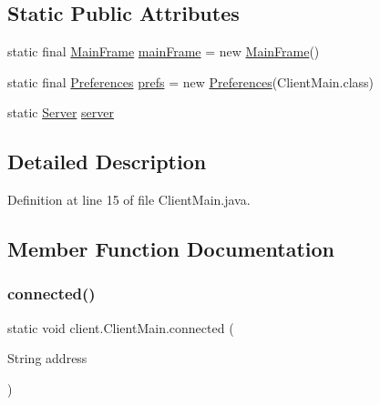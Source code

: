 \subsection*{Static Public Attributes}
\begin{DoxyCompactItemize}
\item 
static final \hyperlink{classclient_1_1ui_1_1_main_frame}{Main\+Frame} \hyperlink{classclient_1_1_client_main_ab0ba57ef294e065b9140994413a5d705}{main\+Frame} = new \hyperlink{classclient_1_1ui_1_1_main_frame}{Main\+Frame}()
\item 
static final \hyperlink{classpt_1_1up_1_1fe_1_1lpro1613_1_1sharedlib_1_1utils_1_1_preferences}{Preferences} \hyperlink{classclient_1_1_client_main_ac9b44e4112c8079879407cb8292d5fe3}{prefs} = new \hyperlink{classpt_1_1up_1_1fe_1_1lpro1613_1_1sharedlib_1_1utils_1_1_preferences}{Preferences}(Client\+Main.\+class)
\item 
static \hyperlink{classclient_1_1conn_1_1_server}{Server} \hyperlink{classclient_1_1_client_main_a933025baa76b4803c185b02d359a7e15}{server}
\end{DoxyCompactItemize}


\subsection{Detailed Description}


Definition at line 15 of file Client\+Main.\+java.



\subsection{Member Function Documentation}
\hypertarget{classclient_1_1_client_main_a37085a4271a663544855402f2892fb51}{}\label{classclient_1_1_client_main_a37085a4271a663544855402f2892fb51} 
\subsubsection{\texorpdfstring{connected()}{connected()}}
{\footnotesize\ttfamily static void client.\+Client\+Main.\+connected (\begin{DoxyParamCaption}\item[{String}]{address }\end{DoxyParamCaption})\hspace{0.3cm}{\ttfamily [static]}}


